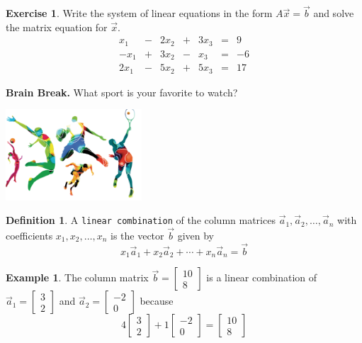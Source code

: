 \documentclass[handout]{beamer}
\newcommand{\veca}{\vec{a}}
\newcommand{\vecb}{\vec{b}}
\newcommand{\vecx}{\vec{x}}
\newcommand{\fn}{\insertframenumber}
\theoremstyle{definition}
\newtheorem{exercise}{Exercise}
\newtheorem*{defn}{Definition}
\newtheorem*{exa}{Example}
\renewcommand{\emph}[1]{{\color{blue}\texttt{#1}}}
\begin{document}
\begin{frame}{\fn}
	\begin{exercise}
		Write the system of linear equations in the form $A\vecx=\vecb$ and solve the matrix equation for $\vecx$.
		\[
		\begin{array}{rcrcrcr}
			x_1&-&2x_2&+&3x_3&=&9\\
			-x_1&+&3x_2&-&x_3&=&-6\\
			2x_1&-&5x_2&+&5x_3&=&17
		\end{array}
		\]
	\end{exercise}
\end{frame}
\begin{frame}{\fn}
	\begin{block}{\textbf{Brain Break.}}
		What sport is your favorite to watch?
		\begin{center}
			\includegraphics[width=2in]{../images/sports}
		\end{center}
	\end{block}
\end{frame}
\begin{frame}{\fn}
	\begin{defn}
		A \emph{linear combination} of the column matrices $\veca_1,\veca_2,\dots,\veca_n$ with coefficients $x_1,x_2,\dots,x_n$ is the vector $\vecb$ given by 
		\[x_1\veca_1+x_2\veca_2+\cdots+x_n\veca_n=\vecb\]
	\end{defn}
	\begin{exa}
		The column matrix $\vecb=\begin{bmatrix}10\\8\end{bmatrix}$ is a linear combination of $\veca_1=\begin{bmatrix}3\\2\end{bmatrix}$ and $\veca_2=\begin{bmatrix}-2\\0\end{bmatrix}$ because
		\[
		4\begin{bmatrix}3\\2\end{bmatrix}+
		1\begin{bmatrix}-2\\0\end{bmatrix}
		=\begin{bmatrix}
		10\\8
		\end{bmatrix}
		\]
	\end{exa}
\end{frame}
\end{document}

